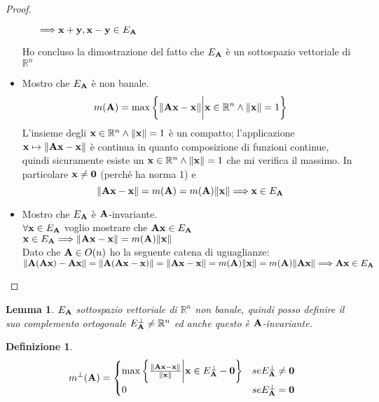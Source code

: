 \documentclass[10pt,a4paper]{article}
\newtheorem{definition}{Definizione}[section]
\newtheorem{lemma}[theorem]{Lemma}
\begin{document}
\begin{proof}
\begin{itemize}
\begin{itemize}
$\Longrightarrow \vb{x+y, x-y} \in E_{\vb{A}} $ 
\end{itemize}  
Ho concluso la dimostrazione del fatto che $E_{\vb{A}}$ è un sottospazio vettoriale di $\mathbb{R}^n $
\item Mostro che $E_{\vb{A}}$ è non banale. 
\[ m(\vb{A}) = \max \bigg\{ \norm{\vb{Ax-x}} \bigg|  \vb{x} \in \mathbb{R}^{n} \land \norm{\vb{x}} = 1 \bigg\} \] 
 L'insieme degli $\vb{x} \in \mathbb{R}^{n} \land \norm{\vb{x}} = 1$ è un compatto; l'applicazione $ \vb{x} \mapsto \norm{\vb{Ax-x}}$ è continua in quanto composizione di funzioni continue, quindi sicuramente esiste un $\vb{x} \in \mathbb{R}^{n} \land \norm{\vb{x}} = 1$  che mi verifica il massimo. In particolare $\vb{x} \neq \vb{0}$  (perché ha norma 1) e 
\[ \norm{\vb{Ax - x}} = m(\vb{A}) = m(\vb{A})\norm{\vb{x}} \Longrightarrow \vb{x} \in E_{\vb{A}}\]
\item Mostro che $E_{\vb{A}}$ è $\vb{A}$-invariante. \\
$\forall \vb{x} \in E_{\vb{A}}$  voglio mostrare che $\vb{Ax} \in E_{\vb{A}}$ \\
$\vb{x} \in E_{\vb{A}} \Longrightarrow \norm{\vb{Ax-x}} = m(\vb{A})\norm{\vb{x}} $ \\
Dato che $\vb{A} \in O(n)$ ho la seguente catena di uguaglianze:\\
$ \norm{\vb{A(Ax) - Ax }} =  \norm{\vb{A(Ax-x)}} = \norm{\vb{Ax - x}} = m(\vb{A})\norm{\vb{x}} = m(\vb{A})\norm{\vb{Ax}} \Longrightarrow \vb{Ax} \in E_{\vb{A}}$
\end{itemize} 
\end{proof}
\begin{lemma}
$E_{\vb{A}}$ sottospazio vettoriale di $\mathbb{R}^n $ non banale, quindi posso definire il suo complemento ortogonale $E^{\perp}_{\vb{A}} \neq \mathbb{R}^n$ ed anche questo è $\vb{A}$-invariante. 
\end{lemma} 

\begin{definition}

\[ m^{\perp}(\vb{A}) = \begin{cases} 
      \max \bigg\{ \frac{\norm{\vb{Ax-x}}}{\norm{\vb{x}}} \bigg|  \vb{x} \in E^{\perp}_{\vb{A}} - \vb{0} \bigg\}  &  se   E^{\perp}_{\vb{A}} \neq {\vb{0}} \\
      0 & se   E^{\perp}_{\vb{A}} = {\vb{0}} \\
      
   \end{cases}
\]

\end{definition}
\end{document}
